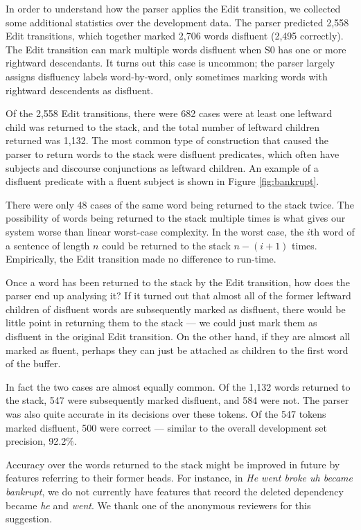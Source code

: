\documentclass[11pt,letterpaper]{article}
\begin{document}
In order to understand how the parser applies the Edit transition, we
collected some additional statistics over the development data.
The parser predicted 2,558 Edit transitions,
which together marked 2,706
words disfluent (2,495 correctly).  The Edit transition can mark multiple words
disfluent when S0 has one or more rightward descendants. It turns out this case
is uncommon;
the parser largely assigns disfluency labels
word-by-word, only sometimes marking words with rightward descendents as disfluent.

Of the 2,558 Edit transitions, there were 682 cases were at least one leftward
child was returned to the stack, and the total number of leftward children returned
was 1,132. The most common type of construction that caused the parser to return
words to the stack
were disfluent predicates, which often have subjects and discourse conjunctions as leftward
children. An example of a disfluent predicate with a fluent subject is shown
in Figure \ref{fig:bankrupt}.

There were only 48 cases of the same word being returned to the stack twice. The
possibility of words being returned to the stack multiple times is what gives our
system worse than linear worst-case complexity. In the worst case, the $i$th word
of a sentence of length $n$ could be returned to the stack $n-(i+1)$ times.
Empirically, the Edit transition made no difference to run-time.

Once a word has been returned to the stack by the Edit transition, how does the
parser end up analysing it?  If it turned out that almost all of the former leftward
children of disfluent words are subsequently marked as disfluent, there would
be little point in returning them to the stack --- we could just mark them as
disfluent in the original Edit transition.  On the other hand, if they are
almost all marked as fluent, perhaps they can just be attached as children
to the first word of the buffer.

In fact the two cases are almost equally common.  Of the 1,132 words returned
to the stack, 547 were subsequently marked disfluent, and 584 were not.  The
parser was also quite accurate in its decisions over these tokens.  Of the 547
tokens marked disfluent, 500 were correct --- similar to the overall development set 
precision, 92.2\%.

Accuracy over the words returned to the stack might be improved in future by
features referring to their former heads. For instance, in \emph{He went broke
uh became bankrupt}, we do not currently have features that record the deleted
dependency became \emph{he} and \emph{went}. We thank one of the anonymous reviewers
for this suggestion.
\end{document}
